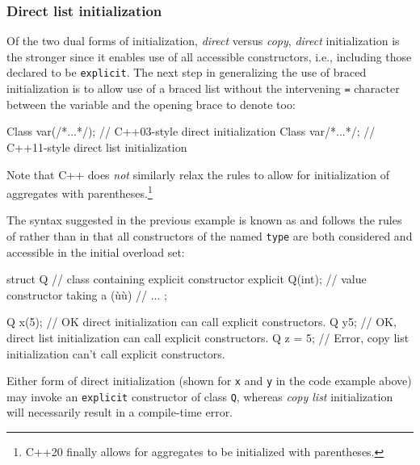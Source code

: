 \subsubsection[Direct list initialization]{Direct list initialization}\label{direct-list-initialization}

Of the two dual forms of initialization, \emph{direct} versus
\emph{copy}, \emph{direct} initialization is the stronger since it
enables use of all accessible constructors, i.e., including those
declared to be \lstinline!explicit!. The next step in generalizing the use
of braced initialization is to allow use of a braced list without the
intervening \lstinline!=! character between the variable and the opening
brace to denote  too:

\begin{emcppslisting}
Class var(/*...*/);  // C++03-style direct initialization
Class var{/*...*/};  // C++11-style direct list initialization
\end{emcppslisting}


\noindent Note that C++ does \emph{not} similarly relax the rules to allow for
initialization of aggregates with parentheses.\footnote{C++20 finally allows for aggregates to be
initialized with parentheses.}

The syntax suggested in the previous example is known as  and follows the rules of  rather than  in that all
constructors of the named \lstinline!type! are both considered and
accessible in the initial overload set:

\begin{emcppslisting}
struct Q  // class containing explicit constructor
{
    explicit Q(int);  // value constructor taking a (ù{}ù)
    // ...
};

Q x(5);    // OK  direct initialization can call explicit constructors.
Q y{5};    // OK, direct list initialization can call explicit constructors.
Q z = {5}; // Error, copy list initialization can't call explicit constructors.
\end{emcppslisting}


\noindent Either form of direct initialization (shown for \lstinline!x! and
\lstinline!y! in the code example above) may invoke an \lstinline!explicit!
constructor of class \lstinline!Q!, whereas \emph{copy list} initialization
will necessarily result in a compile-time error.

